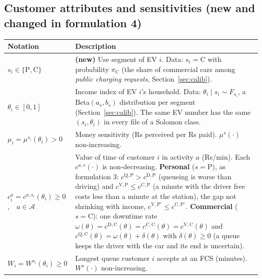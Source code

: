 \documentclass[12pt,a4paper]{article}
\begin{document}
\newpage
\subsection*{Customer attributes and sensitivities (new and changed in formulation 4)}
{\small
\begin{tabularx}{\textwidth}{@{}>{\raggedright\arraybackslash}p{4.6cm}X@{}}
\toprule
\textbf{Notation} & \textbf{Description} \\
\midrule
$s_i\in\{\mathrm P,\mathrm C\}$ & \textbf{(new)} Use segment of EV $i$. Data: $s_i=\mathrm C$ with probability $\pi_{\mathrm C}$ (the share of commercial cars among \emph{public charging requests}, Section~\ref{sec:calib}). \\[2pt]
$\theta_i\in[0,1]$ & Income index of EV $i$'s household. Data: $\theta_i\mid s_i\sim F_{s_i}$, a Beta$(a_{s},b_{s})$ distribution per segment (Section~\ref{sec:calib}). The same EV number has the same $(s_i,\theta_i)$ in every file of a Solomon class. \\[2pt]
$\mu_i=\mu^{s_i}(\theta_i)>0$ & Money sensitivity (Rs perceived per Rs paid). $\mu^{s}(\cdot)$ non-increasing. \\[2pt]
$c^{a}_i=c^{a,s_i}(\theta_i)\ge0$,\ \ $a\in\mathcal A$ & Value of time of customer $i$ in activity $a$ (Rs/min). Each $c^{a,s}(\cdot)$ is non-decreasing.
\newline\textbf{Personal} ($s=\mathrm P$), as formulation 3: $c^{\mathrm Q,\mathrm P}>c^{\mathrm D,\mathrm P}$ (queueing is worse than driving) and $c^{\mathrm V,\mathrm P}\le c^{\mathrm C,\mathrm P}$ (a minute with the driver free costs less than a minute at the station), the gap not shrinking with income, $c^{\mathrm V,\mathrm P\prime}\le c^{\mathrm C,\mathrm P\prime}$.
\newline\textbf{Commercial} ($s=\mathrm C$): one downtime rate $\omega(\theta)=c^{\mathrm D,\mathrm C}(\theta)=c^{\mathrm C,\mathrm C}(\theta)=c^{\mathrm V,\mathrm C}(\theta)$ and $c^{\mathrm Q,\mathrm C}(\theta)=\omega(\theta)+\delta(\theta)$ with $\delta(\theta)\ge0$ (a queue keeps the driver with the car and its end is uncertain). \\[2pt]
$W_i=W^{s_i}(\theta_i)\ge0$ & Longest queue customer $i$ accepts at an FCS (minutes). $W^{s}(\cdot)$ non-increasing. \\
\bottomrule
\end{tabularx}}
\end{document}
